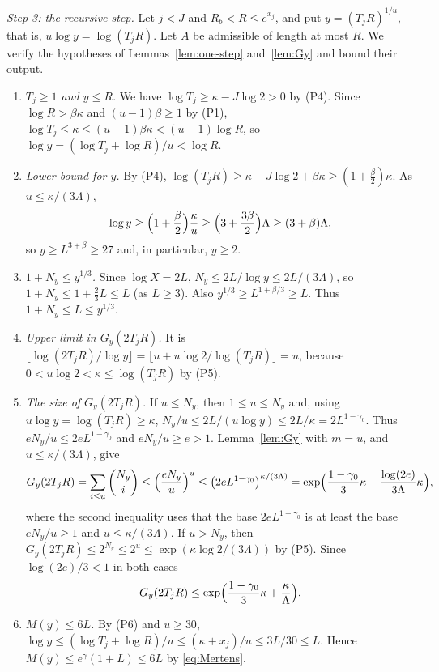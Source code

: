 \medskip\noindent\emph{Step 3: the recursive step.} Let $j<J$ and $R_b<R\le e^{x_j}$, and put $y=(T_jR)^{1/u}$, that is, $u\log y=\log(T_jR)$. Let $A$ be admissible of length at most $R$. We verify the hypotheses of Lemmas~\ref{lem:one-step} and~\ref{lem:Gy} and bound their output.
\begin{enumerate}[label=(\alph*),leftmargin=*]
\item \emph{$T_j\ge1$ and $y\le R$.} We have $\log T_j\ge\kappa-J\log2>0$ by (P4). Since $\log R>\beta\kappa$ and $(u-1)\beta\ge1$ by (P1), $\log T_j\le\kappa\le(u-1)\beta\kappa<(u-1)\log R$, so $\log y=(\log T_j+\log R)/u<\log R$.
\item \emph{Lower bound for $y$.} By (P4), $\log(T_jR)\ge\kappa-J\log2+\beta\kappa\ge(1+\frac\beta2)\kappa$. As $u\le\kappa/(3\Lambda)$,
\[
\log y\ge\Bigl(1+\frac\beta2\Bigr)\frac\kappa u\ge\Bigl(3+\frac{3\beta}2\Bigr)\Lambda\ge(3+\beta)\Lambda,
\]
so $y\ge L^{3+\beta}\ge27$ and, in particular, $y\ge2$.
\item \emph{$1+N_y\le y^{1/3}$.} Since $\log X=2L$, $N_y\le2L/\log y\le2L/(3\Lambda)$, so $1+N_y\le1+\frac23L\le L$ (as $L\ge3$). Also $y^{1/3}\ge L^{1+\beta/3}\ge L$. Thus $1+N_y\le L\le y^{1/3}$.
\item \emph{Upper limit in $G_y(2T_jR)$.} It is $\lfloor\log(2T_jR)/\log y\rfloor=\lfloor u+u\log2/\log(T_jR)\rfloor=u$, because $0<u\log2<\kappa\le\log(T_jR)$ by (P5).
\item \emph{The size of $G_y(2T_jR)$.} If $u\le N_y$, then $1\le u\le N_y$ and, using $u\log y=\log(T_jR)\ge\kappa$, $N_y/u\le2L/(u\log y)\le2L/\kappa=2L^{1-\gamma_0}$. Thus $eN_y/u\le2eL^{1-\gamma_0}$ and $eN_y/u\ge e>1$. Lemma~\ref{lem:Gy} with $m=u$, and $u\le\kappa/(3\Lambda)$, give
\[
G_y(2T_jR)=\sum_{i\le u}\binom{N_y}i\le\Bigl(\frac{eN_y}u\Bigr)^u\le\bigl(2eL^{1-\gamma_0}\bigr)^{\kappa/(3\Lambda)}=\exp\Bigl(\frac{1-\gamma_0}3\kappa+\frac{\log(2e)}{3\Lambda}\kappa\Bigr),
\]
where the second inequality uses that the base $2eL^{1-\gamma_0}$ is at least the base $eN_y/u\ge1$ and $u\le\kappa/(3\Lambda)$. If $u>N_y$, then $G_y(2T_jR)\le2^{N_y}\le2^u\le\exp(\kappa\log2/(3\Lambda))$ by (P5). Since $\log(2e)/3<1$ in both cases
\begin{equation}\label{eq:div-G}
G_y(2T_jR)\le\exp\Bigl(\frac{1-\gamma_0}3\kappa+\frac\kappa\Lambda\Bigr).
\end{equation}
\item \emph{$M(y)\le6L$.} By (P6) and $u\ge30$, $\log y\le(\log T_j+\log R)/u\le(\kappa+x_j)/u\le3L/30\le L$. Hence $M(y)\le e^\gamma(1+L)\le6L$ by \eqref{eq:Mertens}.
\end{enumerate}
